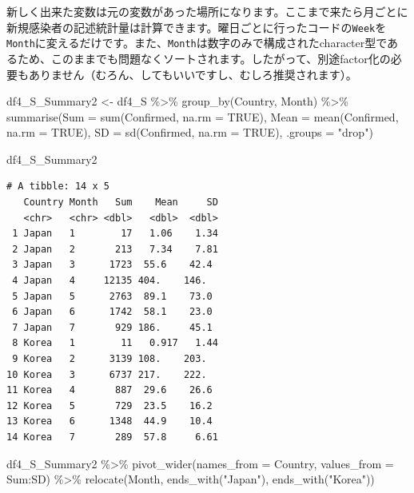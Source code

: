 \documentclass[
  a4paper,
  pandoc,
  ja=standard,
  jafont=haranoaji]{bxjsbook}
\newenvironment{Shaded}{\begin{snugshade}}{\end{snugshade}}
\newcommand{\AttributeTok}[1]{\textcolor[rgb]{0.00,0.48,0.65}{#1}}
\newcommand{\ConstantTok}[1]{\textcolor[rgb]{0.56,0.35,0.01}{#1}}
\newcommand{\FunctionTok}[1]{\textcolor[rgb]{0.28,0.35,0.67}{#1}}
\newcommand{\NormalTok}[1]{\textcolor[rgb]{0.00,0.48,0.65}{#1}}
\newcommand{\OtherTok}[1]{\textcolor[rgb]{0.00,0.48,0.65}{#1}}
\newcommand{\SpecialCharTok}[1]{\textcolor[rgb]{0.37,0.37,0.37}{#1}}
\newcommand{\StringTok}[1]{\textcolor[rgb]{0.13,0.47,0.30}{#1}}
\begin{document}
新しく出来た変数は元の変数があった場所になります。ここまで来たら月ごとに新規感染者の記述統計量は計算できます。曜日ごとに行ったコードの\texttt{Week}を\texttt{Month}に変えるだけです。また、\texttt{Month}は数字のみで構成されたcharacter型であるため、このままでも問題なくソートされます。したがって、別途factor化の必要もありません（むろん、してもいいですし、むしろ推奨されます）。

\begin{Shaded}
\begin{Highlighting}[numbers=left,,]
\NormalTok{df4\_S\_Summary2 }\OtherTok{\textless{}{-}}\NormalTok{ df4\_S }\SpecialCharTok{\%\textgreater{}\%}
  \FunctionTok{group\_by}\NormalTok{(Country, Month) }\SpecialCharTok{\%\textgreater{}\%}
  \FunctionTok{summarise}\NormalTok{(}\AttributeTok{Sum     =} \FunctionTok{sum}\NormalTok{(Confirmed,  }\AttributeTok{na.rm =} \ConstantTok{TRUE}\NormalTok{),}
            \AttributeTok{Mean    =} \FunctionTok{mean}\NormalTok{(Confirmed, }\AttributeTok{na.rm =} \ConstantTok{TRUE}\NormalTok{),}
            \AttributeTok{SD      =} \FunctionTok{sd}\NormalTok{(Confirmed,   }\AttributeTok{na.rm =} \ConstantTok{TRUE}\NormalTok{),}
            \AttributeTok{.groups =} \StringTok{"drop"}\NormalTok{)}

\NormalTok{df4\_S\_Summary2}
\end{Highlighting}
\end{Shaded}

\begin{verbatim}
# A tibble: 14 x 5
   Country Month   Sum    Mean     SD
   <chr>   <chr> <dbl>   <dbl>  <dbl>
 1 Japan   1        17   1.06    1.34
 2 Japan   2       213   7.34    7.81
 3 Japan   3      1723  55.6    42.4 
 4 Japan   4     12135 404.    146.  
 5 Japan   5      2763  89.1    73.0 
 6 Japan   6      1742  58.1    23.0 
 7 Japan   7       929 186.     45.1 
 8 Korea   1        11   0.917   1.44
 9 Korea   2      3139 108.    203.  
10 Korea   3      6737 217.    222.  
11 Korea   4       887  29.6    26.6 
12 Korea   5       729  23.5    16.2 
13 Korea   6      1348  44.9    10.4 
14 Korea   7       289  57.8     6.61
\end{verbatim}

\begin{Shaded}
\begin{Highlighting}[numbers=left,,]
\NormalTok{df4\_S\_Summary2 }\SpecialCharTok{\%\textgreater{}\%}
  \FunctionTok{pivot\_wider}\NormalTok{(}\AttributeTok{names\_from  =}\NormalTok{ Country,}
              \AttributeTok{values\_from =}\NormalTok{ Sum}\SpecialCharTok{:}\NormalTok{SD) }\SpecialCharTok{\%\textgreater{}\%}
  \FunctionTok{relocate}\NormalTok{(Month, }\FunctionTok{ends\_with}\NormalTok{(}\StringTok{"Japan"}\NormalTok{), }\FunctionTok{ends\_with}\NormalTok{(}\StringTok{"Korea"}\NormalTok{))}
\end{Highlighting}
\end{Shaded}
\end{document}
